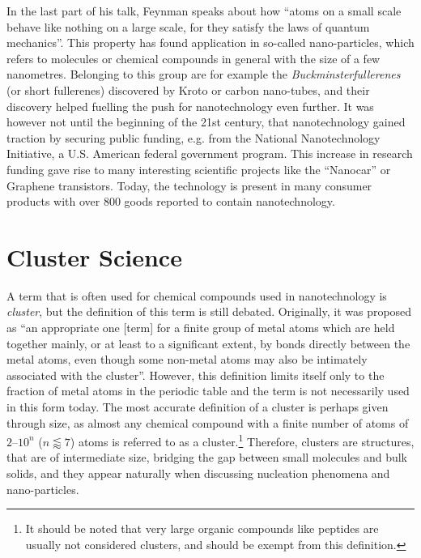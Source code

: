 In the last part of his talk, Feynman speaks about how ``atoms on a small scale
behave like nothing on a large scale, for they satisfy the laws of quantum
mechanics''. This property has found application in so-called nano-particles,
which refers to molecules or chemical compounds in general with the size of a
few nanometres. Belonging to this group are for example the
\emph{Buckminsterfullerenes} (or short fullerenes) discovered by
Kroto\autocite{Kroto_C60Buckminsterfullerene_1985} or carbon
nano-tubes\autocite{Iijima_Helicalmicrotubulesgraphitic_1991}, and their
discovery helped fuelling the push for nanotechnology even further. It was
however not until the beginning of the 21st century, that nanotechnology gained
traction by securing public funding, e.g. from the National Nanotechnology
Initiative, a U.S. American federal government program. This increase in
research funding gave rise to many interesting scientific projects like the
``Nanocar''\autocite{Kudernac_Electricallydrivendirectional_2011} or Graphene
transistors.\autocite{Wu_Highfrequencyscaledgraphene_2011} Today, the technology
is present in many consumer products with over 800 goods reported to contain
nanotechnology.\autocite{Vance_Nanotechnologyrealworld_2015}

\section{Cluster Science}
\label{sec:ClusterScience}

A term that is often used for chemical compounds used in nanotechnology is
\emph{cluster}, but the definition of this term is still debated. Originally,
it was proposed as ``an appropriate one [term] for a finite group of metal
atoms which are held together mainly, or at least to a significant extent, by
bonds directly between the metal atoms, even though some non-metal atoms may
also be intimately associated with the
cluster''.\autocite{Cotton_MetalAtomClusters_1964} However, this definition
limits itself only to the fraction of metal atoms in the periodic table and the
term is not necessarily used in this form today. The most accurate definition
of a cluster is perhaps given through size, as almost any chemical compound
with a finite number of atoms of $2$--$10^n$ ($n\lessapprox 7$) atoms is
referred to as a cluster.\footnote{It should be noted that very large organic
compounds like peptides are usually not considered clusters, and should be
exempt from this
definition.}\autocite{Johnston_Atomicmolecularclusters_2002,Wales_Energylandscapes_2003}
Therefore, clusters are structures, that are of intermediate size, bridging the
gap between small molecules and bulk solids, and they appear naturally when
discussing nucleation phenomena and nano-particles. 

